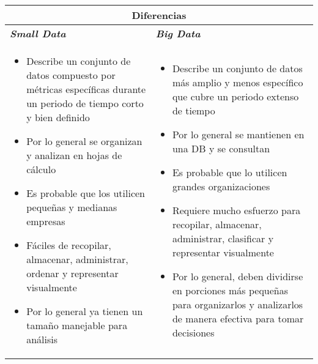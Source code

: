 \begin{table}
    \centering
    \begin{tabular}{|p{7cm}|p{7cm}|}
        \hline
        \multicolumn{2}{|c|}{Diferencias} \\
        \hline
        \textbf{\textit{Small Data}} & \textbf{\textit{Big Data}} \\
        \hline
        \begin{itemize}
            \item {Describe un conjunto de datos compuesto por métricas específicas durante un periodo de tiempo corto y bien definido}
            \item {Por lo general se organizan y analizan en hojas de cálculo}
            \item {Es probable que los utilicen pequeñas y medianas empresas}
            \item {Fáciles de recopilar, almacenar, administrar, ordenar y representar visualmente}
            \item {Por lo general ya tienen un tamaño manejable para análisis}
        \end{itemize} & \begin{itemize}
            \item {Describe un conjunto de datos más amplio y menos específico que cubre un periodo extenso de tiempo}
            \item {Por lo general se mantienen en una DB y se consultan}
            \item {Es probable que lo utilicen grandes organizaciones}
            \item {Requiere mucho esfuerzo para recopilar, almacenar, administrar, clasificar y representar visualmente}
            \item {Por lo general, deben dividirse en porciones más pequeñas para organizarlos y analizarlos de manera efectiva para tomar decisiones}
        \end{itemize} \\
        \hline
    \end{tabular}
\end{table}
\newpage

